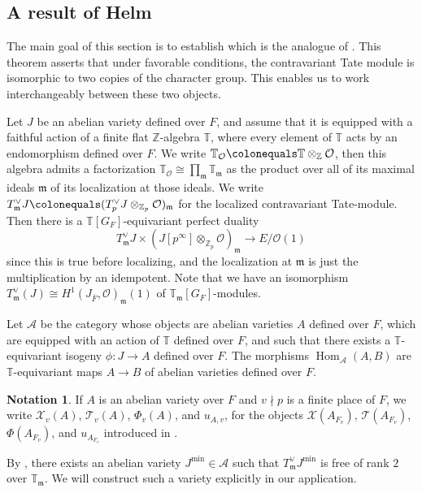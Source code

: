 \documentclass[a4paper, notitlepage, 10pt]{amsart}
\theoremstyle{plain} %
\theoremstyle{definition} %
\newtheorem{notation}[theorem]{Notation}
\theoremstyle{remark} %
\numberwithin{equation}{section}
\newcommand{\bbT}{\mathbb T}
\newcommand{\bbZ}{\mathbb Z}
\newcommand{\Hom}{\operatorname{Hom}} %
\begin{document}
\subsection{A result of Helm}\label{resultofHelm} The main goal of this section is to establish  which is the analogue of \cite[Proposition 4.14]{Helm}. This theorem asserts that under favorable conditions, the contravariant Tate module is isomorphic to two copies of the character group. This enables us to work interchangeably between these two objects.

Let $J$ be an abelian variety defined over $F$, and assume that it is equipped with a faithful action of a finite flat $\bbZ$-algebra $\bbT$, where every element of $\bbT$ acts by an endomorphism defined over $F$. We write $\bbT_{\mathcal{O}}\colonequals \bbT\otimes_{\bbZ}\mathcal{O}$, then this algebra admits a factorization $\bbT_{\mathcal{O}}\cong \prod_{\mathfrak{m}} \bbT_{\mathfrak{m}}$ as the product over all of its maximal ideals $\mathfrak{m}$ of its localization at those ideals. We write $T^\vee_{\mathfrak{m}}J\colonequals(T_p^\vee J\otimes_{\bbZ_p}\mathcal{O})_{\mathfrak{m}}$ for the localized contravariant Tate-module. Then there is a $\bbT[G_F]$-equivariant perfect duality 
$$ T_{\mathfrak{m}}^\vee J \times (J[p^\infty]\otimes_{\bbZ_p}\mathcal{O})_{\mathfrak{m}}\longrightarrow E/\mathcal{O}(1) $$
since this is true before localizing, and the localization at $\mathfrak{m}$ is just the multiplication by an idempotent. Note that we have an isomorphism $T^\vee_{\mathfrak{m}}(J)\cong H^1(J_{\overline{F}},\mathcal{O})_{\mathfrak{m}}(1)$ of $\bbT_{\mathfrak{m}}[G_F]$-modules.

Let $\mathcal{A}$ be the category whose objects are abelian varieties $A$ defined over $F$, which are equipped with an action of $\bbT$ defined over $F$, and such that there exists a $\bbT$-equivariant isogeny $\phi\colon J\to A$ defined over $F$. The morphisms $\Hom_{\mathcal{A}}(A,B)$ are $\bbT$-equivariant maps $A\to B$ of abelian varieties defined over $F$.

\begin{notation}
    If $A$ is an abelian variety over $F$ and $v\nmid p$ is a finite place of $F$, we write $\mathcal{X}_v(A)$, $\mathcal{T}_v(A)$, $\Phi_v(A)$, and $u_{A,v}$, for the objects $\mathcal{X}(A_{F_v})$, $\mathcal{T}(A_{F_v})$, $\Phi(A_{F_v})$, and $u_{A_{F_v}}$ introduced in .
\end{notation}

By \cite[Lemma 4.5]{Helm}, there exists an abelian variety  $J^{\min}\in \mathcal{A}$ such that $T^\vee_{\mathfrak{m}}J^{\min}$ is free of rank $2$ over $\mathbb{T}_{\mathfrak{m}}$. We will construct such a variety explicitly in our application. 
\end{document}
